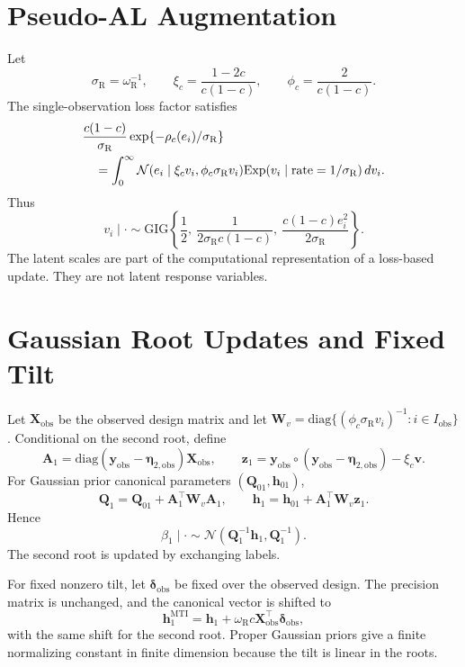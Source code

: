\documentclass[11pt]{article}
\newcommand{\Normal}{\mathcal{N}}
\newcommand{\Exp}{\mathrm{Exp}}
\newcommand{\GIG}{\mathrm{GIG}}
\newcommand{\diag}{\mathrm{diag}}
\newcommand{\vect}[1]{\bm{#1}}
\newcommand{\mat}[1]{\bm{#1}}
\begin{document}
\section{Pseudo-AL Augmentation}
\label{sec:supp-pseudo-al}

Let
\[
\sigma_{\mathrm R}=\omega_{\mathrm R}^{-1},\qquad
\xi_c=\frac{1-2c}{c(1-c)},\qquad
\phi_c=\frac{2}{c(1-c)}.
\]
The single-observation loss factor satisfies
\begin{align}
&\frac{c(1-c)}{\sigma_{\mathrm R}}
\exp\{-\rho_c(e_i)/\sigma_{\mathrm R}\}\notag\\
&\quad=\int_0^\infty
\Normal(e_i\mid \xi_cv_i,\phi_c\sigma_{\mathrm R}v_i)
\Exp(v_i\mid\mathrm{rate}=1/\sigma_{\mathrm R})\,dv_i .
\end{align}
Thus
\[
v_i\mid\cdot\sim
\GIG\left\{
\frac12,\
\frac{1}{2\sigma_{\mathrm R}c(1-c)},\
\frac{c(1-c)e_i^2}{2\sigma_{\mathrm R}}
\right\}.
\]
The latent scales are part of the computational representation of a
loss-based update. They are not latent response variables.

\section{Gaussian Root Updates and Fixed Tilt}
\label{sec:supp-static-updates}

Let \(\mat X_{\mathrm{obs}}\) be the observed design matrix and let
\(\mat W_v=\diag\{(\phi_c\sigma_{\mathrm R}v_i)^{-1}:i\in I_{\mathrm{obs}}\}\).
Conditional on the second root, define
\[
\mat A_1=\diag(\vect y_{\mathrm{obs}}-\vect\eta_{2,\mathrm{obs}})
\mat X_{\mathrm{obs}},
\qquad
\vect z_1=\vect y_{\mathrm{obs}}\circ
(\vect y_{\mathrm{obs}}-\vect\eta_{2,\mathrm{obs}})-\xi_c\vect v.
\]
For Gaussian prior canonical parameters \((\mat Q_{01},\vect h_{01})\),
\[
\mat Q_1=\mat Q_{01}+\mat A_1^\top\mat W_v\mat A_1,\qquad
\vect h_1=\vect h_{01}+\mat A_1^\top\mat W_v\vect z_1.
\]
Hence
\[
\beta_1\mid\cdot\sim
\Normal(\mat Q_1^{-1}\vect h_1,\mat Q_1^{-1}).
\]
The second root is updated by exchanging labels.

For fixed nonzero tilt, let \(\vect\delta_{\mathrm{obs}}\) be fixed over the
observed design. The precision matrix is unchanged, and the canonical vector is
shifted to
\[
\vect h_1^{\mathrm{MTI}}
=\vect h_1+
\omega_{\mathrm R}c\mat X_{\mathrm{obs}}^\top\vect\delta_{\mathrm{obs}},
\]
with the same shift for the second root. Proper Gaussian priors give a finite
normalizing constant in finite dimension because the tilt is linear in the
roots.
\end{document}
